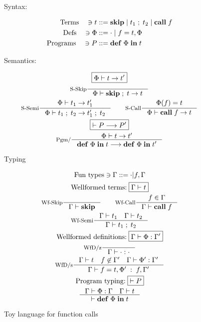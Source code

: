 \documentclass[a4paper, oneside, 10pt, draft]{memoir}
\begin{document}
\begin{figure}
  \begin{center}
    Syntax:
  \end{center}
  \begin{align*}
    \text{Terms} \quad \ni t & ::= \mathbf{skip}{} \; \vert \; t_1 \; ; \; t_2 \; \vert \;
    \mathbf{call} \; f\\
    \text{Defs} \quad \ni \Phi & ::= \cdot \; \vert \; f = t, \Phi\\
    \text{Programs} \quad \ni P & ::= \mathbf{def} \; \Phi \; \mathbf{in} \; t
  \end{align*}
  \begin{center}
    Semantics:
  \end{center}
  \begin{gather*}
    \boxed{\Phi |- t -> t'}\\
    \inference[S-Skip]{}{\Phi |- \fsemi{\fskip{}}{t} -> t}\\
    \inference[S-Semi]{\Phi |- t_1 -> t'_1}{\Phi |- \fsemi{t_1}{t_2}
      -> \fsemi{t'_1}{t_2}} \quad \quad
    \inference[S-Call]{\Phi(f) = t}{\Phi |- \fcall{f} -> t}\\
    \boxed{|- P --> P'}\\
    \inference[Pgm/]{\Phi |- t -> t'}{\fpgm{\Phi}{t} --> \fpgm{\Phi}{t'}}
  \end{gather*}
  \begin{center}
    Typing
  \end{center}
  \begin{gather*}
    \text{Fun types} \ni \Gamma ::= \cdot | f,\Gamma\\
    \text{Wellformed terms:} \; \boxed{\Gamma |- t}\\
    \inference[Wf-Skip]{}{\Gamma |- \fskip{}} \quad \quad
    \inference[Wf-Call]{f \in \Gamma}{\Gamma |- \fcall{f}}\\
    \inference[Wf-Semi]{\Gamma |- t_1 \quad \Gamma |- t_2}{\Gamma |-
      \fsemi{t_1}{t_2}}\\
    \text{Wellformed definitions:} \; \boxed{\Gamma |- \Phi :
      \Gamma'}\\
    \inference[WfD/z]{}{\Gamma |- \cdot : \cdot}\\
    \inference[WfD/s]{\Gamma |- t \quad f \not \in \Gamma' \quad
      \Gamma |- \Phi' : \Gamma'}{\Gamma |- f = t, \Phi' \; : \;
      f,\Gamma'}\\
    \text{Program typing:} \; \boxed{|- P}\\
    \inference{\Gamma |- \Phi : \Gamma \quad \Gamma |- t}{|- \fpgm{\Phi}{t}}
  \end{gather*}
  \caption{Toy language for function calls}
  \label{fig:func-call-lang}
\end{figure}
\end{document}
